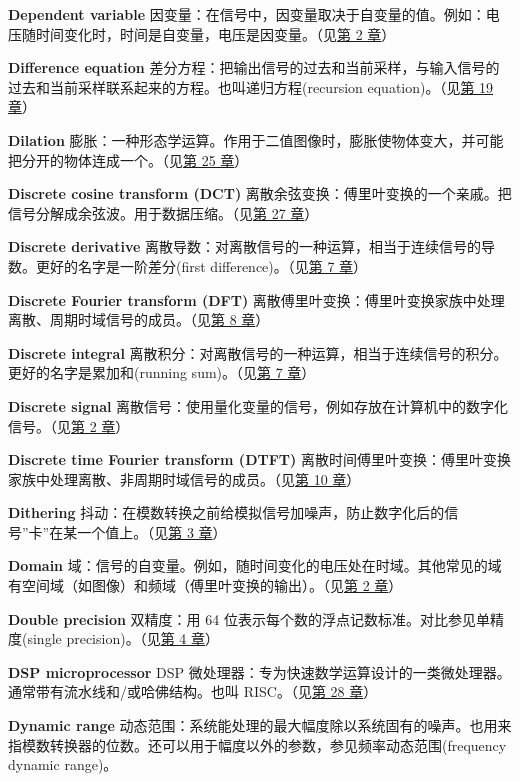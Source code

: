 \textbf{Dependent variable}
因变量：在信号中，因变量取决于自变量的值。例如：电压随时间变化时，时间是自变量，电压是因变量。（见\hyperref[ch-02]{第
2 章}）

\textbf{Difference equation}
差分方程：把输出信号的过去和当前采样，与输入信号的过去和当前采样联系起来的方程。也叫递归方程(recursion
equation)。（见\hyperref[ch-19]{第 19 章}）

\textbf{Dilation}
膨胀：一种形态学运算。作用于二值图像时，膨胀使物体变大，并可能把分开的物体连成一个。（见\hyperref[ch-25]{第
25 章}）

\textbf{Discrete cosine transform (DCT)}
离散余弦变换：傅里叶变换的一个亲戚。把信号分解成余弦波。用于数据压缩。（见\hyperref[ch-27]{第
27 章}）

\textbf{Discrete derivative}
离散导数：对离散信号的一种运算，相当于连续信号的导数。更好的名字是一阶差分(first
difference)。（见\hyperref[ch-07]{第 7 章}）

\textbf{Discrete Fourier transform (DFT)}
离散傅里叶变换：傅里叶变换家族中处理离散、周期时域信号的成员。（见\hyperref[ch-08]{第
8 章}）

\textbf{Discrete integral}
离散积分：对离散信号的一种运算，相当于连续信号的积分。更好的名字是累加和(running
sum)。（见\hyperref[ch-07]{第 7 章}）

\textbf{Discrete signal}
离散信号：使用量化变量的信号，例如存放在计算机中的数字化信号。（见\hyperref[ch-02]{第
2 章}）

\textbf{Discrete time Fourier transform (DTFT)}
离散时间傅里叶变换：傅里叶变换家族中处理离散、非周期时域信号的成员。（见\hyperref[ch-10]{第
10 章}）

\textbf{Dithering}
抖动：在模数转换之前给模拟信号加噪声，防止数字化后的信号''卡''在某一个值上。（见\hyperref[ch-03]{第
3 章}）

\textbf{Domain}
域：信号的自变量。例如，随时间变化的电压处在时域。其他常见的域有空间域（如图像）和频域（傅里叶变换的输出）。（见\hyperref[ch-02]{第
2 章}）

\textbf{Double precision} 双精度：用 64
位表示每个数的浮点记数标准。对比参见单精度(single
precision)。（见\hyperref[ch-04]{第 4 章}）

\textbf{DSP microprocessor} DSP
微处理器：专为快速数学运算设计的一类微处理器。通常带有流水线和/或哈佛结构。也叫
RISC。（见\hyperref[ch-28]{第 28 章}）

\textbf{Dynamic range}
动态范围：系统能处理的最大幅度除以系统固有的噪声。也用来指模数转换器的位数。还可以用于幅度以外的参数，参见频率动态范围(frequency
dynamic range)。

